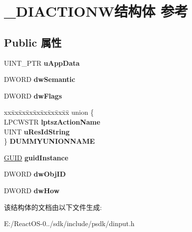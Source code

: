 \hypertarget{struct___d_i_a_c_t_i_o_n_w}{}\section{\+\_\+\+D\+I\+A\+C\+T\+I\+O\+N\+W结构体 参考}
\label{struct___d_i_a_c_t_i_o_n_w}
\subsection*{Public 属性}
\begin{DoxyCompactItemize}
\item 
\mbox{\label{struct___d_i_a_c_t_i_o_n_w_a38c42ac480f96f1db27e72d273bc8c06}} 
U\+I\+N\+T\+\_\+\+P\+TR {\bfseries u\+App\+Data}
\item 
\mbox{\label{struct___d_i_a_c_t_i_o_n_w_abf59442075683fc6b93d3bceeff29e90}} 
D\+W\+O\+RD {\bfseries dw\+Semantic}
\item 
\mbox{\label{struct___d_i_a_c_t_i_o_n_w_a2485e72c73c5984e4ee93db6691839d3}} 
D\+W\+O\+RD {\bfseries dw\+Flags}
\item 
\mbox{\label{struct___d_i_a_c_t_i_o_n_w_a4e073af071da80cbcabbecb7b638e1dd}} 
\begin{tabbing}
xx\=xx\=xx\=xx\=xx\=xx\=xx\=xx\=xx\=\kill
union \{\\
\>LPCWSTR {\bfseries lptszActionName}\\
\>UINT {\bfseries uResIdString}\\
\} {\bfseries DUMMYUNIONNAME}\\

\end{tabbing}\item 
\mbox{\label{struct___d_i_a_c_t_i_o_n_w_a28125af246ef517d515e0939601b33cb}} 
\hyperlink{interface_g_u_i_d}{G\+U\+ID} {\bfseries guid\+Instance}
\item 
\mbox{\label{struct___d_i_a_c_t_i_o_n_w_afb375a33189a5eb9600e95c8f92488c0}} 
D\+W\+O\+RD {\bfseries dw\+Obj\+ID}
\item 
\mbox{\label{struct___d_i_a_c_t_i_o_n_w_a80c476402447fcd46a50074dda53393e}} 
D\+W\+O\+RD {\bfseries dw\+How}
\end{DoxyCompactItemize}


该结构体的文档由以下文件生成\+:\begin{DoxyCompactItemize}
\item 
E\+:/\+React\+O\+S-\/0../sdk/include/psdk/dinput.\+h\end{DoxyCompactItemize}
